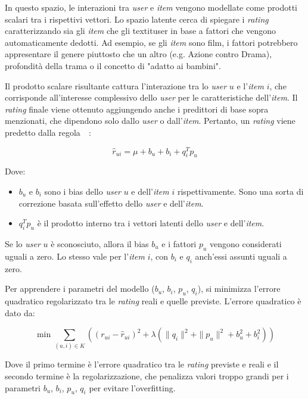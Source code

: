 In questo spazio, le interazioni tra \textit{user} e \textit{item} vengono modellate come prodotti scalari tra i rispettivi vettori. Lo spazio latente cerca di spiegare i \textit{rating} caratterizzando sia gli \textit{item} che gli textit{user} in base a fattori che vengono automaticamente dedotti. Ad esempio, se gli \textit{item} sono film, i fattori potrebbero appresentare il genere piuttosto che un altro (e.g. Azione contro Drama), profondità della trama o il concetto di "adatto ai bambini".

Il prodotto scalare risultante cattura l'interazione tra lo \textit{user} $u$ e l'\textit{item} $i$, che corrisponde all'interesse complessivo dello \textit{user} per le caratteristiche dell'\textit{item}. Il \textit{rating} finale viene ottenuto aggiungendo anche i predittori di base sopra menzionati, che dipendono solo dallo \textit{user} o dall'\textit{item}. Pertanto, un \textit{rating} viene predetto dalla regola~\cite{SVD_analysis}~\cite{Recommendation_book}:

\[
\hat{r}_{ui} = \mu + b_u + b_i + q_i^T p_u
\]

Dove:
\begin{itemize}
    \item $ b_u $ e $ b_i $ sono i bias dello \textit{user} $u$ e dell'\textit{item} $i$ rispettivamente. Sono una sorta di correzione basata sull'effetto dello \textit{user} e dell'\textit{item}.
    \item $ q_i^T p_u $ è il prodotto interno tra i vettori latenti dello \textit{user} e dell'\textit{item}.
\end{itemize}

Se lo \textit{user} $u$ è sconosciuto, allora il bias $b_u$ e i fattori $p_u$ vengono considerati uguali a zero. Lo stesso vale per
l'\textit{item} $i$, con $b_i$ e $q_i$ anch'essi assunti uguali a zero.

Per apprendere i parametri del modello ($b_u$, $b_i$, $p_u$, $q_i$), si minimizza l'errore quadratico regolarizzato tra le \textit{rating} reali e quelle previste. L'errore quadratico è dato da:

\[
\min \sum\limits_{(u,i) \in K} \left( (r_{ui} - \hat{r}_{ui})^2 + \lambda (\|q_i\|^2 + \|p_u\|^2 + b_u^2 + b_i^2) \right)
\]


Dove il primo termine è l'errore quadratico tra le \textit{rating} previste e reali e il secondo termine è la regolarizzazione, che penalizza valori troppo grandi per i parametri $b_u$, $b_i$, $p_u$, $q_i$ per evitare l'overfitting.


